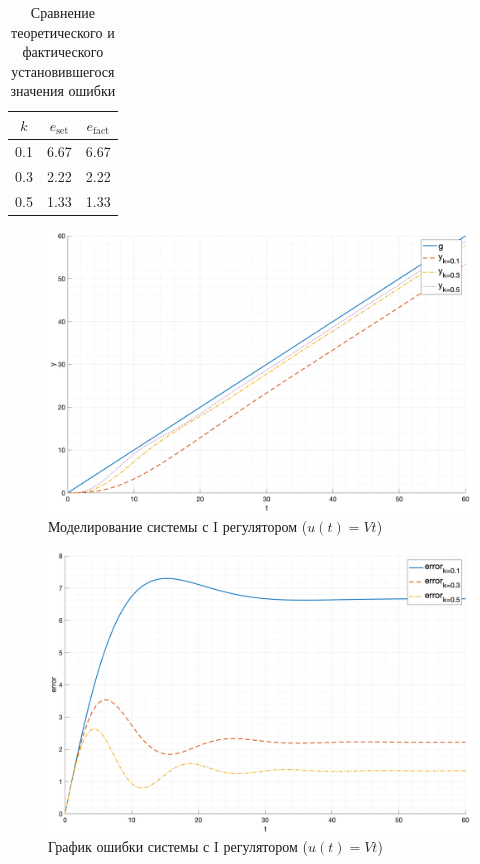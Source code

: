 \begin{table}[ht!]
    \centering
    \begin{tabular}{|c|c|c|}
        \hline
        $k$ & $e_{\text{set}}$ & $e_{\text{fact}}$ \\
        \hline
        0.1 & 6.67 & 6.67 \\
        0.3 & 2.22 & 2.22 \\
        0.5 & 1.33 & 1.33 \\
        \hline
    \end{tabular}
    \caption{Сравнение теоретического и фактического установившегося значения ошибки}
\end{table}

\begin{figure}[ht!]
    \centering
    \includegraphics[width=\textwidth]{"media/plots/task4_out2.png"}
    \caption{Моделирование системы с I регулятором ($u(t) = Vt$)}
    \label{fig:task4_out2}
\end{figure}

\begin{figure}[ht!]
    \centering
    \includegraphics[width=\textwidth]{"media/plots/task4_error2.png"}
    \caption{График ошибки системы с I регулятором ($u(t) = Vt$)}
    \label{fig:task4_error2}
\end{figure}

